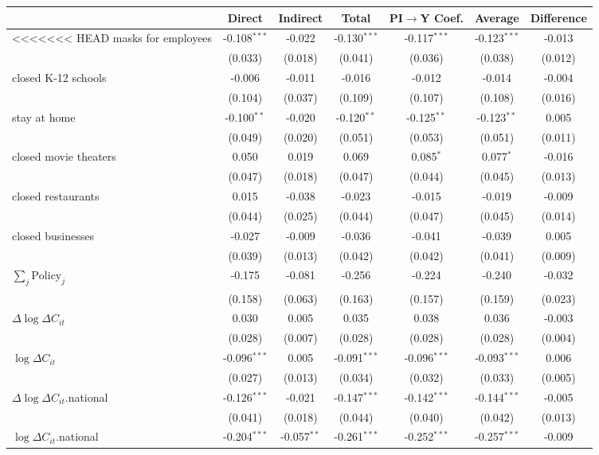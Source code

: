 
\begin{tabular}{lccccc|>{}c}
\toprule
  & Direct & Indirect & Total & PI$\to$Y Coef. & Average & Difference\\
\midrule
<<<<<<< HEAD
masks for employees & -0.108$^{***}$ & -0.022 & -0.130$^{***}$ & -0.117$^{***}$ & -0.123$^{***}$ & -0.013\\
 & (0.033) & (0.018) & (0.041) & (0.036) & (0.038) & (0.012)\\
closed K-12 schools & -0.006 & -0.011 & -0.016 & -0.012 & -0.014 & -0.004\\
 & (0.104) & (0.037) & (0.109) & (0.107) & (0.108) & (0.016)\\
stay at home & -0.100$^{**}$ & -0.020 & -0.120$^{**}$ & -0.125$^{**}$ & -0.123$^{**}$ & 0.005\\
 & (0.049) & (0.020) & (0.051) & (0.053) & (0.051) & (0.011)\\
closed movie theaters & 0.050 & 0.019 & 0.069 & 0.085$^{*}$ & 0.077$^{*}$ & -0.016\\
 & (0.047) & (0.018) & (0.047) & (0.044) & (0.045) & (0.013)\\
closed restaurants & 0.015 & -0.038 & -0.023 & -0.015 & -0.019 & -0.009\\
 & (0.044) & (0.025) & (0.044) & (0.047) & (0.045) & (0.014)\\
closed businesses & -0.027 & -0.009 & -0.036 & -0.041 & -0.039 & 0.005\\
 & (0.039) & (0.013) & (0.042) & (0.042) & (0.041) & (0.009)\\
$\sum_j \mathrm{Policy}_j$ & -0.175 & -0.081 & -0.256 & -0.224 & -0.240 & -0.032\\
 & (0.158) & (0.063) & (0.163) & (0.157) & (0.159) & (0.023)\\
$\Delta \log \Delta C_{it}$ & 0.030 & 0.005 & 0.035 & 0.038 & 0.036 & -0.003\\
 & (0.028) & (0.007) & (0.028) & (0.028) & (0.028) & (0.004)\\
$\log \Delta C_{it}$ & -0.096$^{***}$ & 0.005 & -0.091$^{***}$ & -0.096$^{***}$ & -0.093$^{***}$ & 0.006\\
 & (0.027) & (0.013) & (0.034) & (0.032) & (0.033) & (0.005)\\
$\Delta \log \Delta C_{it}$.national & -0.126$^{***}$ & -0.021 & -0.147$^{***}$ & -0.142$^{***}$ & -0.144$^{***}$ & -0.005\\
 & (0.041) & (0.018) & (0.044) & (0.040) & (0.042) & (0.013)\\
$\log \Delta C_{it}$.national & -0.204$^{***}$ & -0.057$^{**}$ & -0.261$^{***}$ & -0.252$^{***}$ & -0.257$^{***}$ & -0.009\\

\end{tabular}
